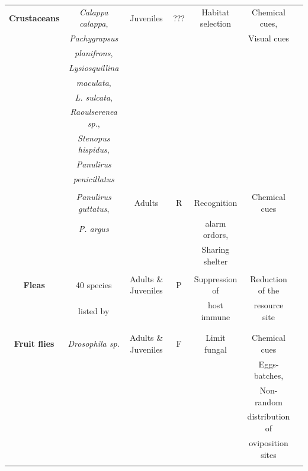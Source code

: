 \begin{landscape}
\begin{table}
	
	\label{tab:mixedsp2}
	\centering
	\begin{tabular*}{\linewidth}{@{\extracolsep{\fill}}ccccccc}
          \textbf{Crustaceans}	&\textit{Calappa calappa},	&Juveniles	&???	&Habitat selection	&Chemical cues,	&\cite{lecchini_ecological_2010}\\
          &\textit{Pachygrapsus}	&	&	&	&Visual cues	&\\
          &\textit{planifrons},	&	&	&	&	&\\
          &\textit{Lysiosquillina}	&	&	&	&	&\\
          &\textit{maculata},	&	&	&	&	&\\
          &\textit{L. sulcata},	&	&	&	&	&\\ 	
          &\textit{Raoulserenea sp.},	&	&	&	&	&\\ 
          &\textit{Stenopus hispidus},	&	&	&	&	&\\ 
          &\textit{Panulirus}	&	&	&	&	&\\ 
          &\textit{penicillatus}	&	&	&	&	&\\ 
          &	&	&	&	&	&\\
          &\textit{Panulirus guttatus},	&Adults	&R	&Recognition	&Chemical cues	&\citep{lozano-alvarez_coexistence_2007,lozano-alvarez_den_2001,briones-fourzan_influence_2008}\\ 
          &\textit{P. argus}	&	&	&alarm ordors,	&	&\\
          &	&	&	&Sharing shelter	&	&\\
          &	&	&	&	&	&\\
          
          \textbf{Fleas}	&40 species	&Adults \& Juveniles	&P	&Suppression of	&Reduction of the	&\citep{krasnov_aggregation_2006,krasnov_larval_2005}\\ 
          & listed by 	&	&	&host immune	&resource site	&\\
          &\citet{stanko_mammal_2002}	&	&	&	&	&\\
          &	&	&	&	&	&\\
          
          \textbf{Fruit flies}	&\textit{Drosophila sp.}	&Adults \& Juveniles	&F	&Limit fungal	&Chemical cues	&\citep{jaenike_aggregation_1991,wertheim_effects_2006,wertheim_evolutionary_2005}\\
          &	&	&	&	&Eggs-batches,	&\\
          &	&	&	&	&Non-random	&\\
          &	&	&	&	&distribution of	&\\
          &	&	&	&	&oviposition sites	&\\
          &	&	&	&	&	&\\
           
	\end{tabular*}
    \end{table}
		
\end{landscape}

